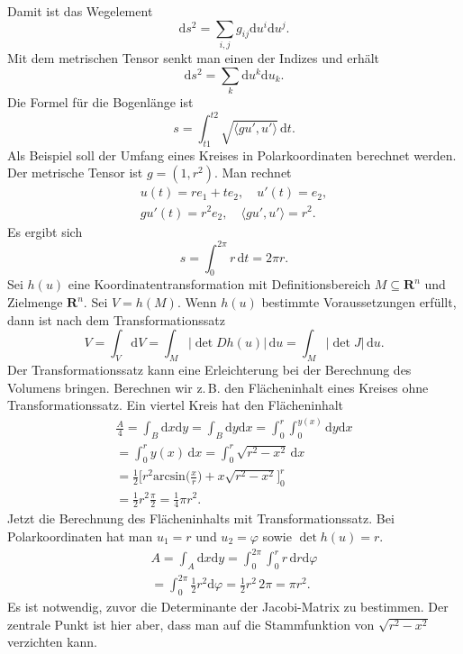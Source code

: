 \documentclass[a4paper,10pt,fleqn,twocolumn,twoside]{article}
\numberwithin{equation}{section}
\begin{document}
Damit ist das Wegelement
\begin{equation}
\mathrm ds^2 = \sum_{i,j} g_{ij}\mathrm du^i\mathrm du^j.
\end{equation}
Mit dem metrischen Tensor senkt man einen der Indizes
und erhält
\begin{equation}
\mathrm ds^2 = \sum_{k}\mathrm du^k\mathrm du_k.
\end{equation}
Die Formel für die Bogenlänge ist
\begin{equation}
s = \int_{t1}^{t2}
\sqrt{\langle gu',u'\rangle}\,\mathrm dt.
\end{equation}
%
Als Beispiel soll der Umfang eines Kreises in Polarkoordinaten
berechnet werden. Der metrische Tensor ist $g=(1,r^2)$.
Man rechnet
\begin{gather*}
u(t)=re_1+te_2,\quad
u'(t) = e_2,\\
gu'(t) = r^2e_2,\quad
\langle gu',u'\rangle = r^2.
\end{gather*}
Es ergibt sich
\begin{equation}
s = \int_0^{2\pi} r\,\mathrm dt = 2\pi r.
\end{equation}
%
Sei $h(u)$ eine Koordinatentransformation mit Definitionsbereich
$M\subseteq\mathbf R^n$ und Zielmenge $\mathbf R^n$.
Sei $V=h(M)$. Wenn $h(u)$ bestimmte Voraussetzungen erfüllt,
dann ist nach dem Transformationssatz
\begin{equation}
V = \int_V \mathrm dV = \int_M |{\det Dh(u)}|\,\mathrm du
= \int_M |{\det J}|\,\mathrm du.
\end{equation}
Der Transformationssatz kann eine Erleichterung bei der Berechnung
des Volumens bringen. Berechnen wir z.\,B. den Flächeninhalt eines
Kreises ohne Transformationssatz. Ein viertel Kreis hat den
Flächeninhalt
\begin{gather*}
\frac{A}{4} = \int_B \mathrm dx\mathrm dy
= \int_B \mathrm dy\mathrm dx
= \int_{0}^r\int_{0}^{y(x)} \mathrm dy\mathrm dx\\
= \int_{0}^r y(x)\,\mathrm dx
= \int_{0}^r \sqrt{r^2-x^2}\,\mathrm dx\\
= \frac{1}{2}\Big[r^2\mathrm{arcsin}\Big(\frac{x}{r}\Big)
+ x\sqrt{r^2-x^2}\Big]_0^r\\
= \frac{1}{2} r^2 \frac{\pi}{2}
= \frac{1}{4}\pi r^2.
\end{gather*}
Jetzt die Berechnung des Flächeninhalts mit Transformationssatz.
Bei Polarkoordinaten hat man $u_1=r$ und $u_2=\varphi$
sowie $\det h(u)=r$.
\begin{gather*}
A = \int_A \mathrm dx\mathrm dy
= \int_0^{2\pi}\int_0^r r\,\mathrm dr\mathrm d\varphi\\
= \int_0^{2\pi} \frac{1}{2}r^2\mathrm d\varphi
= \frac{1}{2}r^2\,2\pi = \pi r^2.
\end{gather*}
Es ist notwendig, zuvor die Determinante der Jacobi-Matrix zu
bestimmen. Der zentrale Punkt ist hier aber, dass man auf die
Stammfunktion von $\sqrt{r^2-x^2}$ verzichten kann.
\end{document}
